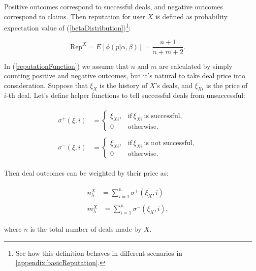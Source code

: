 \documentclass[11pt]{article}
\begin{document}
Positive outcomes correspond to successful deals, and negative outcomes correspond to claims. Then  reputation for user $ X $ is defined as probability expectation value of (\ref{betaDistribution})\footnote{See how this definition behaves in different scenarios in \ref{appendix:basicReputation}.}:

\begin{equation} \label{reputationFunction}
\text{Rep}^{X} = E[\phi(p | \alpha, \beta)] = \frac{n + 1}{n + m + 2}.
\end{equation}

In (\ref{reputationFunction}) we assume that $ n $ and $ m $ are calculated by simply counting positive and negative outcomes, but it's natural to take deal price into consideration. Suppose that $ \xi_{X} $ is the history of $ X $'s deals, and $ \xi_{Xi} $ is the price of $ i $-th deal. Let's define helper functions to tell successful deals from unsuccessful:

\begin{align}
\begin{split}
\sigma^{+}(\xi, i) {}& = \begin{cases} \xi_{Xi}, & \text{if}\ \xi_{Xi}\ \mbox{is successful}, \\ 0 & \mbox{otherwise.} \end{cases}
\end{split} \\
\begin{split}
\sigma^{-}(\xi, i) {}& = \begin{cases} \xi_{Xi}, & \text{if}\ \xi_{Xi}\ \mbox{is not successful}, \\ 0 & \mbox{otherwise.} \end{cases}
\end{split}
\end{align}

Then deal outcomes can be weighted by their price as:

\begin{align}
\begin{split}
n_{\lambda}^{X} {}& = \sum_{i = 1}^{n} \sigma^{+}(\xi_X, i)
\end{split} \\
\begin{split}
m_{\lambda}^{X} {}& = \sum_{i = 1}^{n} \sigma^{-}(\xi_X, i),
\end{split}
\end{align}

where $ n $ is the total number of deals made by $ X $.
\end{document}
